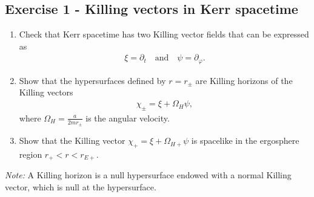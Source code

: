 \documentclass[10pt,a4paper]{article}
\theoremstyle{definition}
\begin{document}
\subsection*{Exercise 1 - Killing vectors in Kerr spacetime}
{\color{blue}

\begin{enumerate}[1.)]
\item Check that Kerr spacetime has two Killing vector fields that can be expressed as
\begin{align}
\xi = \partial_t \quad \text{and} \quad \psi = \partial_\varphi.
\end{align}

\item Show that the hypersurfaces defined by $r = r_\pm$ are Killing horizons of the Killing vectors
\begin{align}
\chi_\pm = \xi + \Omega_H \psi,
\end{align}
where $\Omega_H = \frac{a}{2mr_\pm}$ is the angular velocity.

\item Show that the Killing vector $\chi_+ = \xi + \Omega_{H+} \psi$ is spacelike in the ergosphere region $r_+ < r < r_{E+}$.

\end{enumerate}
\bigskip
\noindent\textit{Note:} A Killing horizon is a null hypersurface endowed with a normal Killing vector, which is null at the hypersurface.
}
\end{document}
